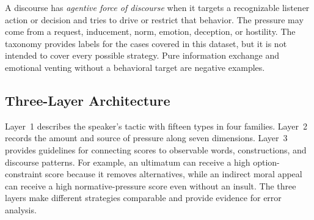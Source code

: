 \documentclass[conference]{IEEEtran}
\newcommand{\afd}{agentive force of discourse}
\begin{document}
A discourse has \emph{\afd{}} when it targets a recognizable listener action
or decision and tries to drive or restrict that behavior. The pressure may
come from a request, inducement, norm, emotion, deception, or hostility. The
taxonomy provides labels for the cases covered in this dataset, but it is not
intended to cover every possible strategy. Pure information exchange and
emotional venting without a behavioral target are negative examples.

\subsection{Three-Layer Architecture}
Layer~1 describes the speaker's tactic with fifteen types in four families.
Layer~2 records the amount and source of pressure along seven dimensions.
Layer~3 provides guidelines for connecting scores to observable words,
constructions, and discourse patterns. For example, an ultimatum can receive a high option-constraint
score because it removes alternatives, while an indirect moral appeal can
receive a high normative-pressure score even without an insult. The three
layers make different strategies comparable and provide evidence for error
analysis.
\end{document}
